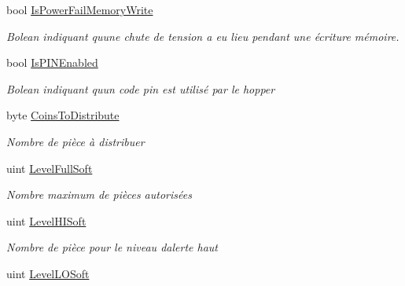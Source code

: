 \begin{DoxyCompactItemize}
bool \mbox{\hyperlink{class_device_library_1_1_c_hopper_ab6ddbdf218466891ec4df5b618f22b57}{Is\+Power\+Fail\+Memory\+Write}}
\begin{DoxyCompactList}\small\item\em Bolean indiquant qu\textquotesingle{}une chute de tension a eu lieu pendant une écriture mémoire. \end{DoxyCompactList}\item 
bool \mbox{\hyperlink{class_device_library_1_1_c_hopper_a6cba5628502ed179dc886abe0e553879}{Is\+P\+I\+N\+Enabled}}
\begin{DoxyCompactList}\small\item\em Bolean indiquant qu\textquotesingle{}un code pin est utilisé par le hopper \end{DoxyCompactList}\item 
byte \mbox{\hyperlink{class_device_library_1_1_c_hopper_a11dafc48a8a680909486f10a61b80de1}{Coins\+To\+Distribute}}
\begin{DoxyCompactList}\small\item\em Nombre de pièce à distribuer \end{DoxyCompactList}\item 
uint \mbox{\hyperlink{class_device_library_1_1_c_hopper_ade03b189fd3b60ae0be1b0ecc4b58177}{Level\+Full\+Soft}}
\begin{DoxyCompactList}\small\item\em Nombre maximum de pièces autorisées \end{DoxyCompactList}\item 
uint \mbox{\hyperlink{class_device_library_1_1_c_hopper_add0b0bb819e03109708b70ceecc31106}{Level\+H\+I\+Soft}}
\begin{DoxyCompactList}\small\item\em Nombre de pièce pour le niveau d\textquotesingle{}alerte haut \end{DoxyCompactList}\item 
uint \mbox{\hyperlink{class_device_library_1_1_c_hopper_a27713aed4b5a8f43ec2998ddec6ad5f2}{Level\+L\+O\+Soft}}

\end{DoxyCompactItemize}
